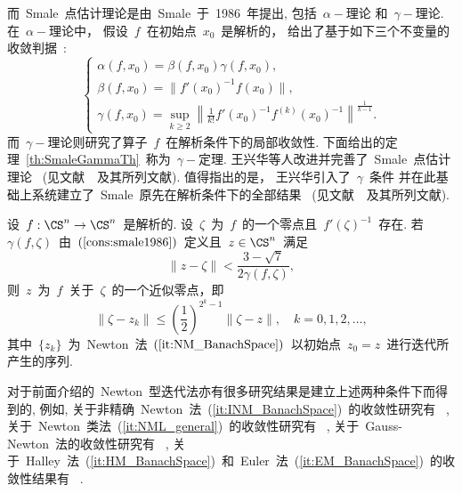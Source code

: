 而~Smale~点估计理论是由~Smale~于~1986~年提出, 包括~$\alpha-$理论
和~$\gamma-$理论. 在~$\alpha-$理论中，
假设~$f$~在初始点~$x_0$~是解析的，
给出了基于如下三个不变量的收敛判据~\cite{Smale1986}:
\begin{equation}
\label{cons:smale1986}
\begin{cases}
\alpha(f,x_0) = \beta(f,x_0)\gamma(f,x_0),\\
\beta(f,x_0) = \|f'(x_0)^{-1}f(x_0)\|,\\
\gamma(f,x_0) = \sup\limits_{k \geqslant 2} \left\|\displaystyle
\frac{1}{k!} f'(x_0)^{-1}f^{(k)}(x_0)^{-1}\right\|^{\frac{1}{k-1}}.
\end{cases}
\end{equation}
而~$\gamma-$理论则研究了算子~$f$~在解析条件下的局部收敛性.
下面给出的定理~\ref{th:SmaleGammaTh}~称为~$\gamma-$定理.
王兴华等人改进并完善了~Smale~点估计理论
~(见文献~\cite{WangLi2001}~及其所列文献). 值得指出的是，
王兴华引入了~$\gamma$~条件
并在此基础上系统建立了~Smale~原先在解析条件下的全部结果
~(见文献~\cite{WangHan1997b}~及其所列文献).


\begin{theorem}
\label{th:SmaleGammaTh} 设~$f: \CS^n \to \CS^n$~是解析的.
设~$\zeta$~为~$f$~的一个零点且~$f'(\zeta)^{-1}$~存在.
若~$\gamma(f,\zeta)$~由~$(\ref{cons:smale1986})$~定义且~$z \in
\CS^n$~满足
\begin{equation}
\label{radius:gamma_AZ} \|z - \zeta\| < \frac{3-\sqrt{7}}{2
\gamma(f,\zeta)},
\end{equation}
则~$z$~为~$f$~关于~$\zeta$~的一个近似零点，即
\begin{equation}
\label{ApproximateZero} \|\zeta - z_k\| \leq
\left(\frac{1}{2}\right)^{2^{k} - 1} \|\zeta - z\|, \quad  k = 0, 1,
2, \ldots,
\end{equation}
其中~$\{z_k\}$~为~Newton~法~$(\ref{it:NM_BanachSpace})$~以初始点~$z_0
= z$~进行迭代所产生的序列.
\end{theorem}

对于前面介绍的~Newton~型迭代法亦有很多研究结果是建立上述两种条件下而得到的,
例如,
关于非精确~Newton~法~(\ref{it:INM_BanachSpace})~的收敛性研究有~
\cite{ChenLi2006,Guo2007,LiShen2008,ShenLi2009,ShenLi2010,Ferreira2011c},
关于~Newton~类法~(\ref{it:NML_general})~的收敛性研究有
~\cite{Yamamoto2000,Morini1999,Ferreira2011b,Ferreira2012a},
关于~Gauss-Newton~法的收敛性研究有~
\cite{DedieuShub2000,DedieuKim2002,Chen2008,LiHuWang2010,Ferreira2011b,XuLi2008},
关于~Halley~法~(\ref{it:HM_BanachSpace})~和~Euler~法~(\ref{it:EM_BanachSpace})~的收敛性结果有
~\cite{Candela1990a,Candela1990b,Ezquerro2005,Gutierrez1997b,YeLi2006,YeLiShen2007}.






